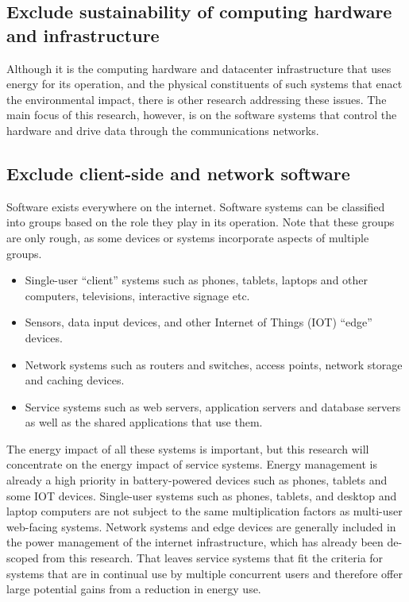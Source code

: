 \subsection{Exclude sustainability of computing hardware and infrastructure}
\label{exclude:hardware}

Although it is the computing hardware and datacenter infrastructure that uses energy for its operation, and the physical constituents of such systems that enact the environmental impact, there is other research addressing these issues. The main focus of this research, however, is on the software systems that control the hardware and drive data through the communications networks.

\subsection{Exclude client-side and network software}
\label{exclude:client and network}

Software exists everywhere on the internet. Software systems can be classified into groups based on the role they play in its operation. Note that these groups are only rough, as some devices or systems incorporate aspects of multiple groups.
\begin{itemize}
    \item Single-user \enquote{client} systems such as phones, tablets, laptops and other computers, televisions, interactive signage etc.
    \item Sensors, data input devices, and other Internet of Things (IOT) \enquote{edge} devices.
    \item Network systems such as routers and switches, access points, network storage and caching devices.
    \item Service systems such as web servers, application servers and database servers as well as the shared applications that use them.
\end{itemize}

The energy impact of all these systems is important, but this research will concentrate on the energy impact of service systems. Energy management is already a high priority in battery-powered devices such as phones, tablets and some IOT devices. Single-user systems such as phones, tablets, and desktop and laptop computers are not subject to the same multiplication factors as multi-user web-facing systems. Network systems and edge devices are generally included in the power management of the internet infrastructure, which has already been de-scoped from this research. That leaves service systems that fit the criteria for systems that are in continual use by multiple concurrent users and therefore offer large potential gains from a reduction in energy use.

